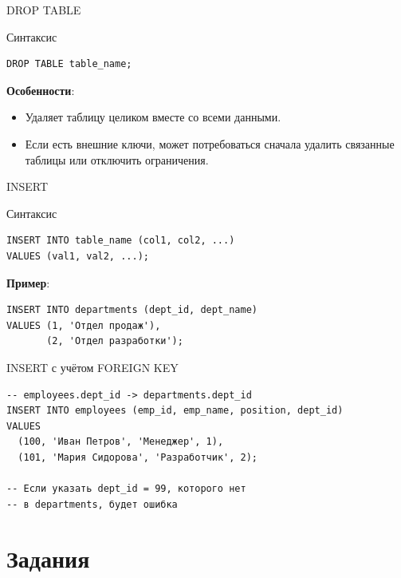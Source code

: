 \documentclass{beamer}
\begin{document}
\begin{frame}[fragile]{DROP TABLE}
	\begin{block}{Синтаксис}
		\begin{verbatim}
DROP TABLE table_name;
\end{verbatim}
	\end{block}

	\textbf{Особенности}:
	\begin{itemize}
		\item Удаляет таблицу целиком вместе со всеми данными.
		\item Если есть внешние ключи, может потребоваться сначала удалить связанные таблицы или отключить ограничения.
	\end{itemize}
\end{frame}

\begin{frame}[fragile]{INSERT}
	\begin{block}{Синтаксис}
		\begin{verbatim}
INSERT INTO table_name (col1, col2, ...)
VALUES (val1, val2, ...);
\end{verbatim}
	\end{block}

	\textbf{Пример}:
	\begin{verbatim}
INSERT INTO departments (dept_id, dept_name)
VALUES (1, 'Отдел продаж'),
       (2, 'Отдел разработки');
    \end{verbatim}
\end{frame}

\begin{frame}[fragile]{INSERT с учётом FOREIGN KEY}
	\begin{verbatim}
-- employees.dept_id -> departments.dept_id
INSERT INTO employees (emp_id, emp_name, position, dept_id)
VALUES
  (100, 'Иван Петров', 'Менеджер', 1),
  (101, 'Мария Сидорова', 'Разработчик', 2);

-- Если указать dept_id = 99, которого нет
-- в departments, будет ошибка
\end{verbatim}
\end{frame}

\section{Задания}
\end{document}
